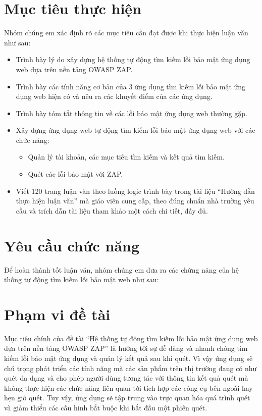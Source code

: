 \section{Mục tiêu thực hiện}

Nhóm chúng em xác định rõ các mục tiêu cần đạt được khi thực hiện luận văn như sau:

\begin{itemize}
    \item Trình bày lý do xây dựng hệ thống tự động tìm kiếm lỗi bảo mật ứng dụng web dựa trên nền tảng OWASP ZAP.
    \item Trình bày các tính năng cơ bản của 3 ứng dụng tìm kiếm lỗi bảo mật ứng dụng web hiện có và nêu ra các khuyết điểm của các ứng dụng.
    \item Trình bày tóm tắt thông tin về các lỗi bảo mật ứng dụng web thường gặp.
    \item Xây dựng ứng dụng web tự động tìm kiếm lỗi bảo mật ứng dụng web với các chức năng:
          \begin{itemize}
              \item Quản lý tài khoản, các mục tiêu tìm kiếm và kết quả tìm kiếm.
              \item Quét các lỗi bảo mật với ZAP.
          \end{itemize}
    \item Viết 120 trang luận văn theo luồng logic trình bày trong tài liệu “Hướng dẫn thực hiện luận văn” mà giáo viên cung cấp, theo đúng chuẩn nhà trường yêu cầu và trích dẫn tài liệu tham khảo một cách chi tiết, đầy đủ.
\end{itemize}

\section{Yêu cầu chức năng}

\tab Để hoàn thành tốt luận văn, nhóm chúng em đưa ra các chứng năng của hệ thống tư động tìm kiếm lỗi bảo mật web như sau:

\section{Phạm vi đề tài}

\tab Mục tiêu chính của đề tài “Hệ thống tự động tìm kiếm lỗi bảo mật ứng dụng web dựa trên nền tảng OWASP ZAP” là hướng tới sự dễ dàng và nhanh chóng tìm kiếm lỗi bảo mật ứng dụng và quản lý kết quả sau khi quét.
Vì vậy ứng dụng sẽ chú trọng phát triển các tính năng mà các sản phẩm trên thị trường đang có như quét đa dạng và cho phép người dùng tương tác với thông tin kết quả quét mà không thực hiện các chức năng liên quan tới tích hợp các công cụ bên ngoài hay hẹn giờ quét.
Tuy vậy, ứng dụng sẽ tập trung vào trực quan hóa quá trình quét và giảm thiểu các cấu hình bắt buộc khi bắt đầu một phiên quét.